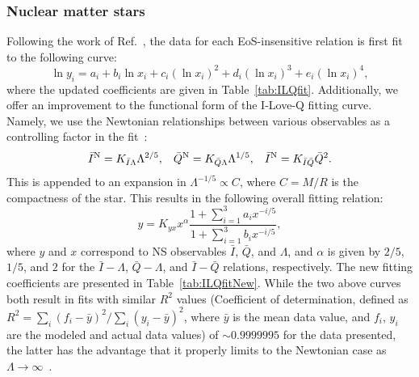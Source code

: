 \documentclass[prd,twocolumn,nofootinbib,superscriptaddress,amsmath,amssymb]{revtex4-1}
\begin{document}
\subsubsection{Nuclear matter stars}\label{sec:ilq-nuc}
Following the work of Ref.~\cite{Yagi:ILQ}, the data for each EoS-insensitive relation is first fit to the following curve:
\begin{equation}\label{eq:ILQfit}
\ln{y_i}=a_i+b_i \ln{x_i} + c_i (\ln{x_i})^2 + d_i (\ln{x_i})^3 + e_i (\ln{x_i})^4,
\end{equation}
where the updated coefficients are given in Table~\ref{tab:ILQfit}.
Additionally, we offer an improvement to the functional form of the I-Love-Q fitting curve. 
Namely, we use the Newtonian relationships between various observables as a controlling factor in the fit~\cite{Yagi:ILQ}:
\begin{equation}\label{eq:Newtonian}
\bar{I}^{\text{N}} = K_{\bar{I}\Lambda}\Lambda^{2/5}, \hspace{3mm} \bar{Q}^{\text{N}} = K_{\bar{Q}\Lambda}\Lambda^{1/5}, \hspace{3mm} \bar{I}^{\text{N}} = K_{\bar{I}\bar{Q}}\bar{Q}^{2}.
\end{equation}
This is appended to an expansion in $\Lambda^{-1/5} \propto C$, where $C=M/R$ is the compactness of the star.
This results in the following overall fitting relation:
\begin{equation}\label{eq:ILQfitNew}
y=K_{yx} x^{\alpha} \frac{1+\sum_{i=1}^3 a_i x^{-i/5}}{1+\sum_{i=1}^3 b_i x^{-i/5}},
\end{equation}
where $y$ and $x$ correspond to NS observables $\bar{I}$, $\bar{Q}$, and $\Lambda$, and $\alpha$ is given by $2/5$, $1/5$, and $2$ for the $\bar{I}-\Lambda$, $\bar{Q}-\Lambda$, and $\bar{I}-\bar{Q}$ relations, respectively.
The new fitting coefficients are presented in Table~\ref{tab:ILQfitNew}.
While the two above curves both result in fits with similar $R^2$ values (Coefficient of determination, defined as $R^2=\sum_i(f_i-\bar{y})^2/\sum_i(y_i-\bar{y})^2$, where $\bar{y}$ is the mean data value, and $f_i$, $y_i$ are the modeled and actual data values) of $\sim 0.9999995$ for the data presented, the latter has the advantage that it properly limits to the Newtonian case as $\Lambda \rightarrow \infty$~\cite{Yagi:binLove}.
\end{document}
